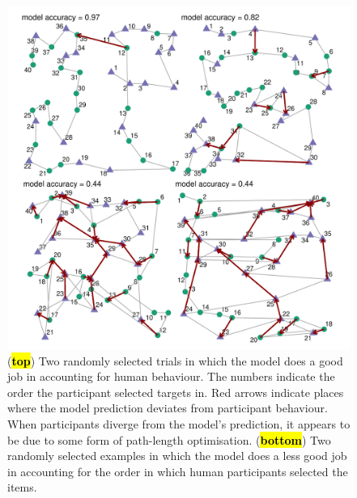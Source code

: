 \documentclass[vision,article,accept,pdftex,moreauthors]{Definitions/mdpi}
\begin{document}
\begin{figure}[H]
\includegraphics[width=12 cm]{Figures/qjep_ex_paths.pdf}
\caption{(\textbf{\hl{top}}) Two randomly selected trials in which the model does a good job in accounting for human behaviour. The numbers indicate the order the participant selected targets in. Red arrows indicate places where the model prediction deviates from participant behaviour. When participants diverge from the model's prediction, it appears to be due to some form of path-length optimisation. (\textbf{\hl{bottom}}) Two randomly selected examples in which the model does a less good job in accounting for the order in which human participants selected the items.}%

\label{fig:qjep_paths}
\end{figure} 
\end{document}
